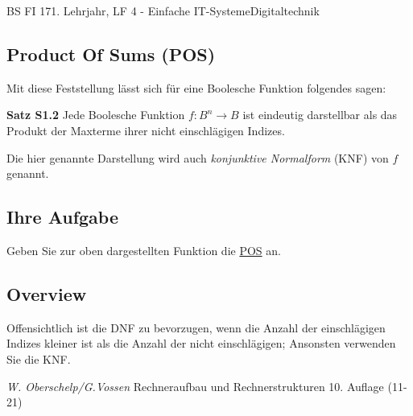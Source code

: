 \documentclass[11pt,twocolumn,oneside,openany,headings=optiontotoc,11pt,numbers=noenddot]{article}
\begin{document}
\begin{worksheet}{BS FI 17}{1. Lehrjahr, LF 4 - Einfache IT-Systeme}{Digitaltechnik}
		\subsection{Product Of Sums (POS)}
		Mit diese Feststellung lässt sich für eine Boolesche Funktion folgendes sagen:
		\begin{framed}
			\textbf{Satz S1.2} Jede Boolesche Funktion \(f: B^n \rightarrow B\) ist eindeutig darstellbar als das Produkt der Maxterme ihrer nicht einschlägigen Indizes.
		\end{framed}
		Die hier genannte Darstellung wird auch \textit{konjunktive Normalform} (KNF) von \(f\) genannt.
		\subsection*{Ihre Aufgabe} Geben Sie zur oben dargestellten Funktion die \underline{POS} an.
		\subsection{Overview} Offensichtlich ist die DNF zu bevorzugen, wenn die Anzahl der einschlägigen Indizes kleiner ist als die Anzahl der nicht einschlägigen; Ansonsten verwenden Sie die KNF.\\
		\par\bigskip\noindent
		\tiny{\color{codegray}\textit{W. Oberschelp/G.Vossen} Rechneraufbau und Rechnerstrukturen 10. Auflage (11-21)}
	\end{worksheet}
\end{document}
